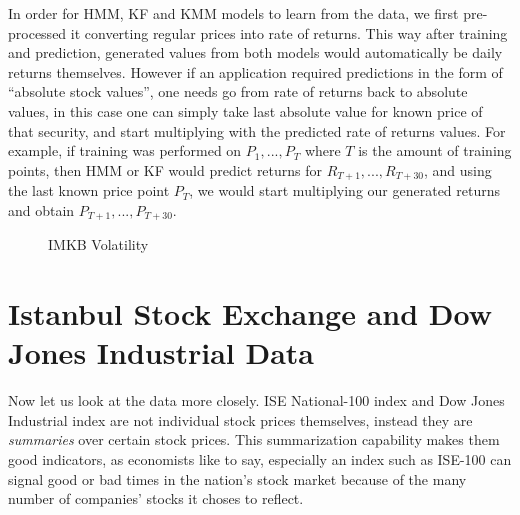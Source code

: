In order for HMM, KF and KMM models to learn from the data, we first pre-processed it
converting regular prices into rate of returns. This way after training and
prediction, generated values from both models would automatically be daily
returns themselves. However if an application required predictions in the form
of ``absolute stock values'', one needs go from rate of returns back to absolute
values, in this case one can simply take last absolute value for known price of
that security, and start multiplying with the predicted rate of returns
values. For example, if training was performed on $P_1,...,P_T$ where $T$ is the
amount of training points, then HMM or KF would predict returns for
$R_{T+1},...,R_{T+30}$, and using the last known price point $P_T$, we would
start multiplying our generated returns and obtain $P_{T+1},...,P_{T+30}$.

\begin{figure}[!hbp]
\caption{IMKB Volatility}
\vspace{0.6cm}
\end{figure}


\section{Istanbul Stock Exchange and Dow Jones Industrial Data}

Now let us look at the data more closely. ISE National-100 index and Dow Jones
Industrial index are not individual stock prices themselves, instead they are
{\em summaries} over certain stock prices. This summarization capability makes
them good indicators, as economists like to say, especially an index such as
ISE-100 can signal good or bad times in the nation's stock market because of the
many number of companies' stocks it choses to reflect.

